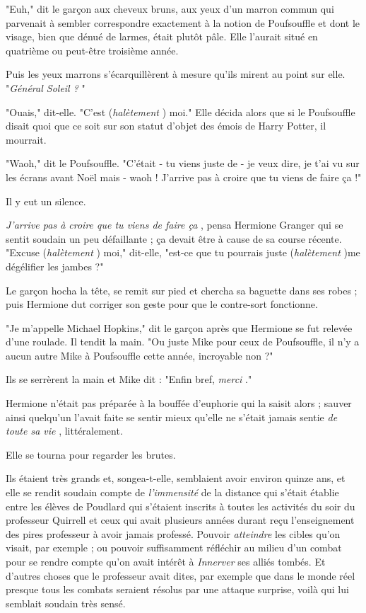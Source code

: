 "Euh," dit le garçon aux cheveux bruns, aux yeux d'un marron commun qui parvenait à sembler correspondre exactement à la notion de Poufsouffle et dont le visage, bien que dénué de larmes, était plutôt pâle. Elle l'aurait situé en quatrième ou peut-être troisième année.

Puis les yeux marrons s'écarquillèrent à mesure qu'ils mirent au point sur elle. "\emph{Général Soleil ?} "

"Ouais," dit-elle. "C'est (\emph{halètement} ) moi." Elle décida alors que si le Poufsouffle disait quoi que ce soit sur son statut d'objet des émois de Harry Potter, il mourrait.

"Waoh," dit le Poufsouffle. "C'était - tu viens juste de - je veux dire, je t'ai vu sur les écrans avant Noël mais - waoh ! J'arrive pas à croire que tu viens de faire ça !"

Il y eut un silence.

\emph{J'arrive pas à croire que tu viens de faire ça} , pensa Hermione Granger qui se sentit soudain un peu défaillante ; ça devait être à cause de sa course récente. "Excuse (\emph{halètement} ) moi," dit-elle, "est-ce que tu pourrais juste (\emph{halètement} )me dégélifier les jambes ?"

Le garçon hocha la tête, se remit sur pied et chercha sa baguette dans ses robes ; puis Hermione dut corriger son geste pour que le contre-sort fonctionne.

"Je m'appelle Michael Hopkins," dit le garçon après que Hermione se fut relevée d'une roulade. Il tendit la main. "Ou juste Mike pour ceux de Poufsouffle, il n'y a aucun autre Mike à Poufsouffle cette année, incroyable non ?"

Ils se serrèrent la main et Mike dit : "Enfin bref, \emph{merci} ."

Hermione n'était pas préparée à la bouffée d'euphorie qui la saisit alors ; sauver ainsi quelqu'un l'avait faite se sentir mieux qu'elle ne s'était jamais sentie \emph{de toute sa vie} , littéralement.

Elle se tourna pour regarder les brutes.

Ils étaient très grands et, songea-t-elle, semblaient avoir environ quinze ans, et elle se rendit soudain compte de \emph{l'immensité}  de la distance qui s'était établie entre les élèves de Poudlard qui s'étaient inscrits à toutes les activités du soir du professeur Quirrell et ceux qui avait plusieurs années durant reçu l'enseignement des pires professeur à avoir jamais professé. Pouvoir \emph{atteindre}  les cibles qu'on visait, par exemple ; ou pouvoir suffisamment réfléchir au milieu d'un combat pour se rendre compte qu'on avait intérêt à \emph{Innerver}  ses alliés tombés. Et d'autres choses que le professeur avait dites, par exemple que dans le monde réel presque tous les combats seraient résolus par une attaque surprise, voilà qui lui semblait soudain très sensé.

